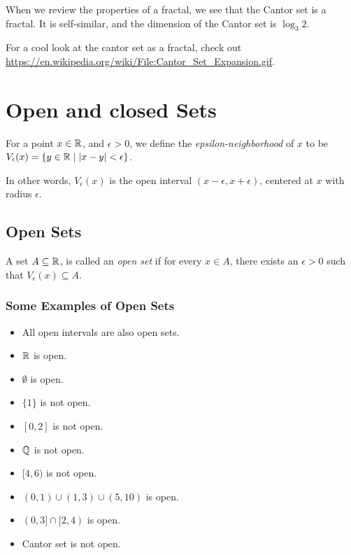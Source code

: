 When we review the properties of a fractal, we see that the Cantor set is a fractal. It is self-similar, and the dimension of the Cantor set is \(\log_3 2\).

\begin{note}
    For a cool look at the cantor set as a fractal, check out \url{https://en.wikipedia.org/wiki/File:Cantor_Set_Expansion.gif}.
\end{note}

\renewcommand{\theenumi}{\arabic{enumi}}
\renewcommand{\labelenumi}{\theenumi.}
\section{Open and closed Sets}

\begin{definition}
    For a point \(x \in \mathbb{R}\), and \(\epsilon > 0\), we define the \textit{epsilon-neighborhood} of \(x\) to be \(V_\epsilon(x) = \{y \in \mathbb{R} \mid |x - y| < \epsilon\}\).
\end{definition}

In other words, \(V_{\epsilon}(x)\) is the open interval \((x - \epsilon, x + \epsilon)\), centered at \(x\) with radius \(\epsilon\).

\subsection{Open Sets}

\begin{definition}
    A set \(A \subseteq \mathbb{R}\), is called an \textit{open set} if for every \(x \in A\), there exists an \(\epsilon > 0\) such that \(V_\epsilon(x) \subseteq A\).
\end{definition}

\subsubsection{Some Examples of Open Sets}

\begin{multicols}{2}
    \begin{itemize}
        \item All open intervals are also open sets.
        \item \(\mathbb{R}\) is open.
        \item \(\emptyset\) is open.
        \item \(\{1\}\) is not open.
        \item \([0,2]\) is not open.
        \item \(\mathbb{Q}\) is not open.
        \item \([4,6)\) is not open.
        \item \((0,1) \cup (1,3) \cup (5,10)\) is open.
        \item \((0,3] \cap [2,4)\) is open.
        \item Cantor set is not open.
    \end{itemize}
\end{multicols}

